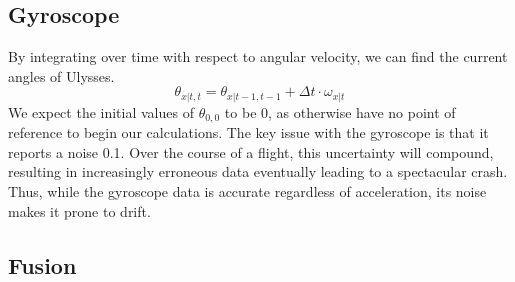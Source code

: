 \documentclass{article}
\begin{document}
\subsection{Gyroscope}
By integrating over time with respect to angular velocity, we can find the current angles of Ulysses.
$$
\theta_{x|t,t}=\theta_{x|t-1,t-1}+\Delta t\cdot\omega_{x|t}
$$
We expect the initial values of $\theta_{0,0}$ to be 0, as otherwise have no point of reference to begin our calculations.
The key issue with the gyroscope is that it reports a noise 0.1\textdegree. Over the course of a flight, this uncertainty will compound, resulting in increasingly erroneous data eventually leading to a spectacular crash.
Thus, while the gyroscope data is accurate regardless of acceleration, its noise makes it prone to drift.
\subsection{Fusion}
\end{document}
